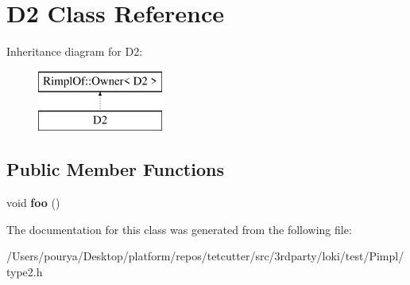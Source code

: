 \hypertarget{classD2}{}\section{D2 Class Reference}
\label{classD2}
Inheritance diagram for D2\+:\begin{figure}[H]
\begin{center}
\leavevmode
\includegraphics[height=2.000000cm]{classD2}
\end{center}
\end{figure}
\subsection*{Public Member Functions}
\begin{DoxyCompactItemize}
\item 
\hypertarget{classD2_ae69417f33beea29eac7d3ccbfbbeec4c}{}void {\bfseries foo} ()\label{classD2_ae69417f33beea29eac7d3ccbfbbeec4c}

\end{DoxyCompactItemize}


The documentation for this class was generated from the following file\+:\begin{DoxyCompactItemize}
\item 
/\+Users/pourya/\+Desktop/platform/repos/tetcutter/src/3rdparty/loki/test/\+Pimpl/type2.\+h\end{DoxyCompactItemize}
